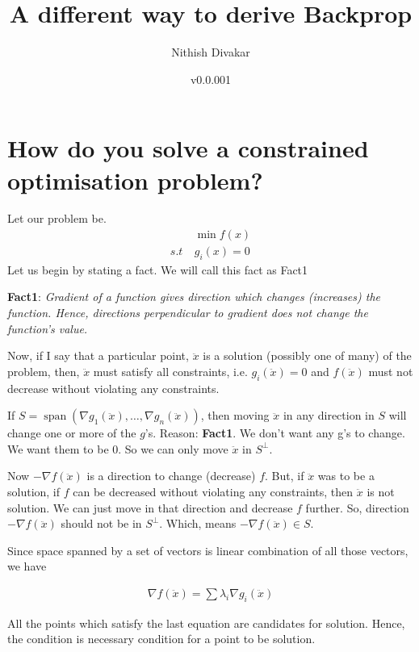 \documentclass[10pt]{article}
\title{A different way to derive Backprop}
\author{Nithish Divakar}
\date{v0.0.001}
\begin{document}
\maketitle
\tableofcontents
\section{How do you solve a constrained optimisation problem?}
Let our problem be.
$$\begin{aligned}
&\min f(x)
\\
s.t~& g_i(x) = 0
\end{aligned}$$
Let us begin by stating a fact. We will call this fact as Fact1

\begin{center}
\textbf{Fact1}: \textit{Gradient of a function gives direction which changes (increases) the function. Hence, directions perpendicular to gradient does not change the function's value.}
\end{center}


Now, if I say that a particular point, $\ddot{x}$ is a solution (possibly one of many) of the problem, then, $\ddot{x}$ must satisfy all constraints, i.e. $g_i(\ddot{x}) = 0$ and $f(\ddot{x})$ must not decrease without violating any constraints. 

If $S = \operatorname{span}(\nabla g_1(\ddot{x}),\ldots, \nabla g_n(\ddot{x}))$, then moving $\ddot{x}$ in any direction in $S$ will change one or more of the $g$'s. Reason: \textbf{Fact1}. We don't want any g's to change. We want them to be 0. So we can only move $\ddot{x}$ in $S^{\perp}$.

Now $-\nabla f(\ddot{x})$ is a direction to change (decrease) $f$. But, if $\ddot{x}$ was to be a solution, if $f$ can be decreased without violating any constraints, then $\ddot{x}$ is not solution. We can just move in that direction and decrease $f$ further. So, direction $-\nabla f(\ddot{x})$ should not be in $S^{\perp}$. Which, means $-\nabla f(\ddot{x}) \in S$. 

Since space spanned by a set of vectors is linear combination of all those vectors, we have

$$\begin{aligned}
\nabla f(\ddot{x}) = \sum \lambda_i \nabla g_i(\ddot{x})
\end{aligned}$$

All the points which satisfy the last equation are candidates for solution. Hence, the condition is necessary condition for a point to be solution. 
\end{document}
